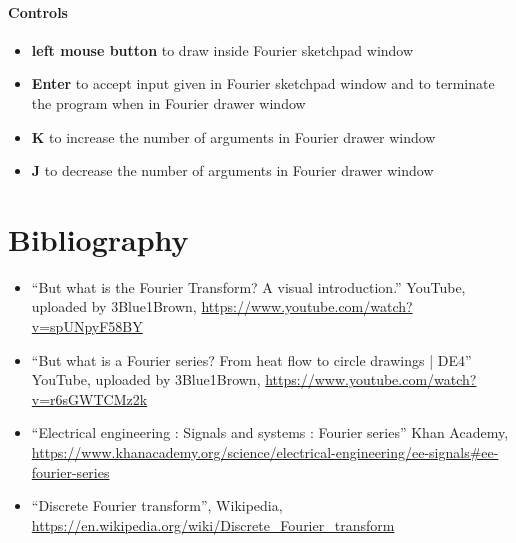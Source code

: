 \documentclass[titlepage]{article}
\begin{document}
    \paragraph{Controls}
    \begin{itemize}
        \item \textbf{left mouse button} to draw inside Fourier sketchpad window
        \item \textbf{Enter} to accept input given in Fourier sketchpad window
            and to terminate the program when in Fourier drawer window
        \item \textbf{K} to increase the number of arguments in Fourier drawer 
            window
        \item \textbf{J} to decrease the number of arguments in Fourier drawer 
            window
    \end{itemize}

\section{Bibliography}

    \begin{itemize}
        \item ``But what is the Fourier Transform? A visual introduction.'' YouTube, 
            uploaded by 3Blue1Brown, \url{https://www.youtube.com/watch?v=spUNpyF58BY}
        \item ``But what is a Fourier series? From heat flow to circle drawings | DE4'' 
            YouTube, uploaded by 3Blue1Brown, \url{https://www.youtube.com/watch?v=r6sGWTCMz2k}
        \item ``Electrical engineering : Signals and systems : Fourier series'' Khan
            Academy, \url{https://www.khanacademy.org/science/electrical-engineering/ee-signals#ee-fourier-series} 
        \item ``Discrete Fourier transform'', Wikipedia, \url{https://en.wikipedia.org/wiki/Discrete_Fourier_transform}
    \end{itemize}
\end{document}
